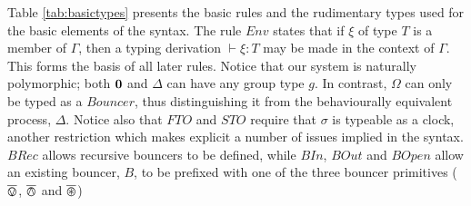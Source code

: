 \documentclass[orivec,envcountsame]{llncs}
\begin{document}
Table \ref{tab:basictypes} presents the basic rules and the rudimentary
types used for the basic elements of the syntax. The rule $Env$ states
that if $\xi$ of type $T$ is a member of $\Gamma$, then a typing
derivation $\vdash \xi : T$ may be made in the context of $\Gamma$.
This forms the basis of all later rules.  Notice that our system is
naturally polymorphic; both $\textbf{0}$ and $\Delta$ can have any group type
$g$.  In contrast, $\Omega$ can only be typed as a $Bouncer$, thus
distinguishing it from the behaviourally equivalent process, $\Delta$.
Notice also that $FTO$ and $STO$ require that $\sigma$ is typeable as a
clock, another restriction which makes explicit a number of issues
implied in the syntax.  $BRec$ allows recursive bouncers to be defined,
while $BIn$, $BOut$ and $BOpen$ allow an existing bouncer, $B$, to be
prefixed with one of the three bouncer primitives ($\overline{\varovee}$, $\overline{\varowedge}$ and
$\overline{\varoast}$)
\end{document}
